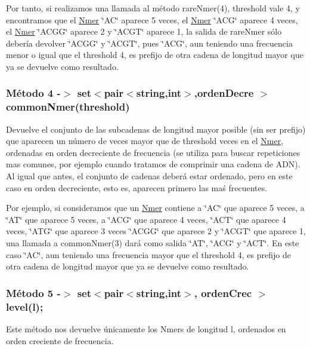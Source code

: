 Por tanto, si realizamos una llamada al método rare\+Nmer(4), threshold vale 4, y encontramos que el \hyperlink{classNmer}{Nmer} \char`\"{}\+A\+C\char`\"{} aparece 5 veces, el \hyperlink{classNmer}{Nmer} \char`\"{}\+A\+C\+G\char`\"{} aparece 4 veces, el \hyperlink{classNmer}{Nmer} \char`\"{}\+A\+C\+G\+G\char`\"{} aparece 2 y \char`\"{}\+A\+C\+G\+T\char`\"{} aparece 1, la salida de rare\+Nmer sólo debería devolver \char`\"{}\+A\+C\+G\+G\char`\"{} y \char`\"{}\+A\+C\+G\+T\char`\"{}, pues \char`\"{}\+A\+C\+G\char`\"{}, aun teniendo una frecuencia menor o igual que el threshold 4, es prefijo de otra cadena de longitud mayor que ya se devuelve como resultado.\hypertarget{index_common}{}\subsubsection{Método 4 -\/$>$  set$<$pair$<$string,int$>$,orden\+Decre $>$ common\+Nmer(threshold)}\label{index_common}
Devuelve el conjunto de las subcadenas de longitud mayor posible (sin ser prefijo) que aparecen un número de veces mayor que de threshold veces en el \hyperlink{classNmer}{Nmer}, ordenadas en orden decreciente de frecuencia (se utiliza para buscar repeticiones mas comunes, por ejemplo cuando tratamos de comprimir una cadena de A\+DN). Al igual que antes, el conjunto de cadenas deberá estar ordenado, pero en este caso en orden decreciente, esto es, aparecen primero las maś frecuentes.

Por ejemplo, si consideramos que un \hyperlink{classNmer}{Nmer} contiene a \char`\"{}\+A\+C\char`\"{} que aparece 5 veces, a \char`\"{}\+A\+T\char`\"{} que aparece 5 veces, a \char`\"{}\+A\+C\+G\char`\"{} que aparece 4 veces, \char`\"{}\+A\+C\+T\char`\"{} que aparece 4 veces, \char`\"{}\+A\+T\+G\char`\"{} que aparece 3 veces \char`\"{}\+A\+C\+G\+G\char`\"{} que aparece 2 y \char`\"{}\+A\+C\+G\+T\char`\"{} que aparece 1, una llamada a {\ttfamily common\+Nmer(3)} dará como salida \char`\"{}\+A\+T\char`\"{}, \char`\"{}\+A\+C\+G\char`\"{} y \char`\"{}\+A\+C\+T\char`\"{}. En este caso \char`\"{}\+A\+C\char`\"{}, aun teniendo una frecuencia mayor que el threshold 4, es prefijo de otra cadena de longitud mayor que ya se devuelve como resultado.\hypertarget{index_level}{}\subsubsection{Método 5 -\/$>$ set$<$pair$<$string,int$>$, orden\+Crec $>$ level(l);}\label{index_level}
Este método nos devuelve únicamente los Nmers de longitud l, ordenados en orden creciente de frecuencia.

